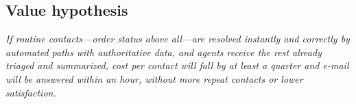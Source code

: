 \subsection{Value hypothesis}

\begin{keyidea}
\emph{If routine contacts---order status above all---are resolved instantly and correctly by automated paths with authoritative data, and agents receive the rest already triaged and summarized, cost per contact will fall by at least a quarter and e-mail will be answered within an hour, without more repeat contacts or lower satisfaction.}
\end{keyidea}
